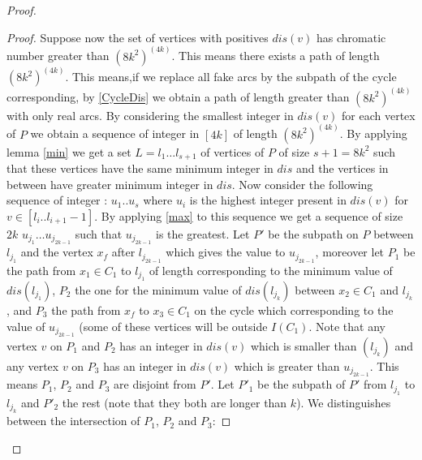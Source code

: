 \documentclass[10pt]{article}
\theoremstyle{plain}
\theoremstyle{definition}
\theoremstyle{remark}
\begin{document}
\begin{proof}
\begin{proof}





Suppose now the set of vertices with positives $dis(v)$ has chromatic number greater than $(8k^2)^(4k)$. 
This means there exists a path of length $(8k^2)^(4k)$. This means,if we replace all fake arcs by the subpath of 
the cycle corresponding, by \ref{CycleDis} we obtain a path of length greater than $(8k^2)^(4k)$ with only real arcs. 
By considering the smallest integer in $dis(v)$ for each vertex of $P$ we obtain a sequence of integer in $[4k]$ of length $(8k^2)^(4k)$. 
By applying lemma \ref{min} we get a set $L = l_1 \dots l_{s+1}$ of vertices of $P$ of size $s+1 = 8k^2$ such that these 
vertices have the same minimum integer in $dis$ and the vertices in between have greater minimum integer in $dis$. 
Now consider the following sequence of integer : $u_1 .. u_s$ where $u_i$ is the highest integer present in $dis(v)$ 
for $v \in [l_i .. l_{i+1} - 1]$. 
By applying \ref{max} to this sequence we get a sequence of size $2k$ $u_{j_1} \dots u_{j_{2k-1}}$ such that $u_{j_{2k-1}}$ is the greatest.
Let $P'$ be the subpath on $P$ between $l_{j_1}$ and the vertex $x_f$ after $l_{j_{2k-1}}$ which gives the value to $u_{j_{2k-1}}$,
moreover let $P_1$  be the path from $x_1 \in C_1$ to $l_{j_1}$ of length corresponding to the minimum value of $dis(l_{j_1})$, 
$P_2$ the one for the minimum value of $dis(l_{j_k})$ between $x_2 \in C_1$ and $l_{j_k}$, and $P_3$ the path 
from $x_f$ to $x_3 \in C_1$ on the cycle which corresponding to the value of $u_{j_{2k-1}}$ 
(some of these vertices will be outside $I(C_1)$. Note that any vertex $v$ on $P_1$ and $P_2$ has an integer in $dis(v)$ 
which is smaller than $(l_{j_k})$ and any vertex $v$ on $P_3$ has an integer in $dis(v)$ which is greater than $u_{j_{2k-1}}$. This means 
$P_1$, $P_2$ and $P_3$ are disjoint from $P'$. Let $P'_1$ be the subpath of $P'$ from $l_{j_1}$ to $l_{j_k}$ and  $P'_2$ the rest
(note that they both are longer than $k$). 
We distinguishes between the intersection of $P_1$, $P_2$ and $P_3$:


\end{proof}
\end{proof}
\end{document}
